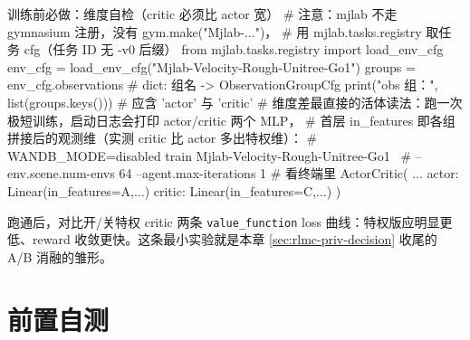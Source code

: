 \begin{codebox}[Python]{训练前必做：维度自检（critic 必须比 actor 宽）}
# 注意：mjlab 不走 gymnasium 注册，没有 gym.make("Mjlab-...")，
# 用 mjlab.tasks.registry 取任务 cfg（任务 ID 无 -v0 后缀）
from mjlab.tasks.registry import load_env_cfg
env_cfg = load_env_cfg("Mjlab-Velocity-Rough-Unitree-Go1")
groups = env_cfg.observations          # dict: 组名 -> ObservationGroupCfg
print("obs 组：", list(groups.keys()))  # 应含 'actor' 与 'critic'
# 维度差最直接的活体读法：跑一次极短训练，启动日志会打印 actor/critic 两个 MLP，
# 首层 in_features 即各组拼接后的观测维（实测 critic 比 actor 多出特权维）：
#   WANDB_MODE=disabled train Mjlab-Velocity-Rough-Unitree-Go1 \
#       --env.scene.num-envs 64 --agent.max-iterations 1
# 看终端里 ActorCritic( ... actor: Linear(in_features=A,...) critic: Linear(in_features=C,...) )
\end{codebox}

跑通后，对比开/关特权 critic 两条 \verb|value_function| loss 曲线：特权版应明显更低、reward 收敛更快。这条最小实验就是本章 \cref{sec:rlmc-priv-decision} 收尾的 A/B 消融的雏形。

\section*{前置自测}
\label{sec:rlmc-priv-selftest}

